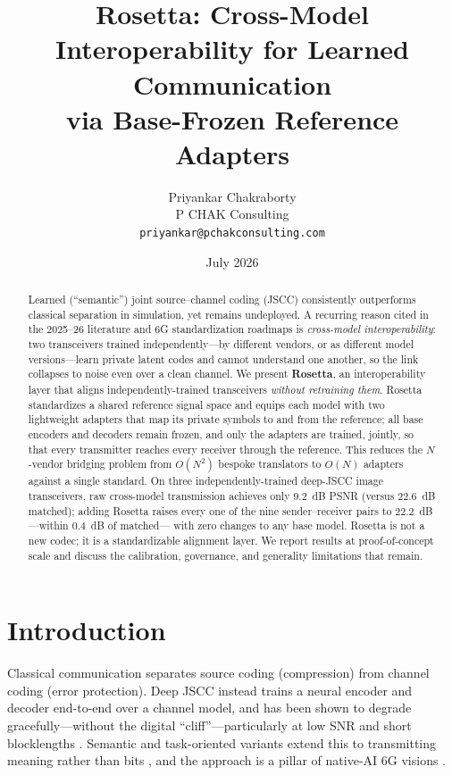 \documentclass[11pt]{article}
\title{\textbf{Rosetta: Cross-Model Interoperability for Learned Communication\\ via Base-Frozen Reference Adapters}}
\author{Priyankar Chakraborty\\ \small P CHAK Consulting \\ \small \texttt{priyankar@pchakconsulting.com}}
\date{July 2026}
\begin{document}
\maketitle

\begin{abstract}
Learned (``semantic'') joint source--channel coding (JSCC) consistently outperforms
classical separation in simulation, yet remains undeployed. A recurring reason cited
in the 2025--26 literature and 6G standardization roadmaps is \emph{cross-model
interoperability}: two transceivers trained independently---by different vendors, or
as different model versions---learn private latent codes and cannot understand one
another, so the link collapses to noise even over a clean channel. We present
\textbf{Rosetta}, an interoperability layer that aligns independently-trained
transceivers \emph{without retraining them}. Rosetta standardizes a shared reference
signal space and equips each model with two lightweight adapters that map its private
symbols to and from the reference; all base encoders and decoders remain frozen, and
only the adapters are trained, jointly, so that every transmitter reaches every
receiver through the reference. This reduces the $N$-vendor bridging problem from
$O(N^2)$ bespoke translators to $O(N)$ adapters against a single standard. On three
independently-trained deep-JSCC image transceivers, raw cross-model transmission
achieves only $9.2$~dB PSNR (versus $22.6$~dB matched); adding Rosetta raises every
one of the nine sender--receiver pairs to $22.2$~dB---within $0.4$~dB of matched---%
with zero changes to any base model. Rosetta is not a new codec; it is a
standardizable alignment layer. We report results at proof-of-concept scale and
discuss the calibration, governance, and generality limitations that remain.
\end{abstract}

\section{Introduction}
Classical communication separates source coding (compression) from channel coding
(error protection). Deep JSCC instead trains a neural encoder and decoder end-to-end
over a channel model, and has been shown to degrade gracefully---without the digital
``cliff''---particularly at low SNR and short blocklengths
\cite{bourtsoulatze2019,kurka2020}. Semantic and task-oriented variants extend this to
transmitting meaning rather than bits \cite{xie2021,gunduz2023}, and the approach is a
pillar of native-AI 6G visions \cite{roadmap2025}.
\end{document}
